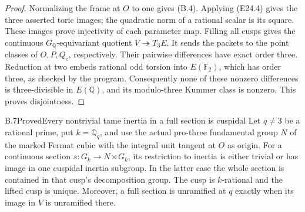 \begin{proof}
Normalizing the frame at $O$ to one gives (B.4).  Applying (E24.4)
gives the three asserted toric images; the quadratic norm of a
rational scalar is its square.  These images prove injectivity of
each parameter map.  Filling all cusps gives the continuous
$G_{\mathbb Q}$-equivariant quotient $V\twoheadrightarrow T_3E$.
It sends the packets to the point classes of $O,P,Q_c$, respectively.
Their pairwise differences have exact order three.  Reduction at two
embeds rational odd torsion into $E(\mathbb F_2)$, which has order
three, as checked by the program.  Consequently none of these
nonzero differences is three-divisible in $E(\mathbb Q)$, and its
modulo-three Kummer class is nonzero.  This proves disjointness.
\end{proof}

\begin{statement}{B.7}{Proved}{Every nontrivial tame inertia in a full section is cuspidal}
Let $q\ne3$ be a rational prime, put $k=\mathbb Q_q$, and
use the actual pro-three fundamental group $N$ of the marked
Fermat cubic with the integral unit tangent at $O$ as origin.
For a continuous section $s:G_k\to N\rtimes G_k$, its
restriction to inertia is either trivial or has image in one
cuspidal inertia subgroup.  In the latter case the whole
section is contained in that cusp's decomposition group.
The cusp is $k$-rational and the lifted cusp is unique.
Moreover, a full section is unramified at $q$ exactly when
its image in $V$ is unramified there.
\end{statement}
